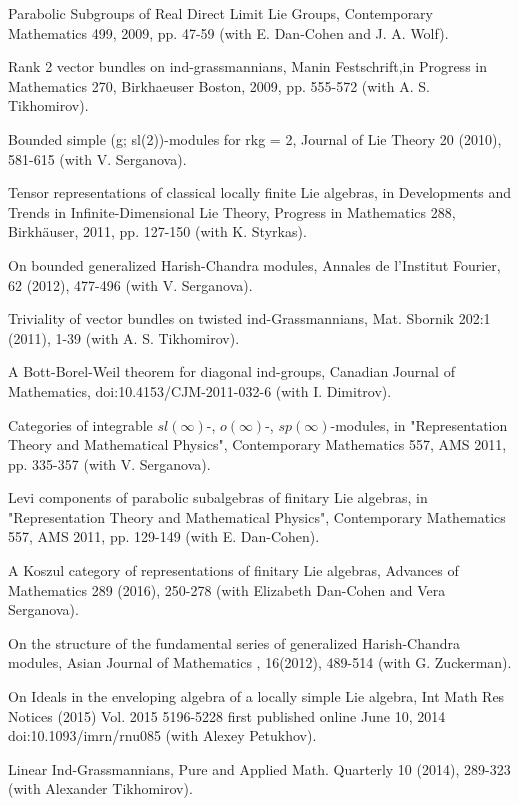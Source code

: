 \documentclass[11pt]{amsart}
\begin{document}
\myss \label{47.} Parabolic Subgroups of Real Direct Limit Lie Groups, Contemporary Mathematics 499, 2009, pp. 47-59 (with E. Dan-Cohen and J. A. Wolf).

\myss \label{48.} Rank 2 vector bundles on ind-grassmannians, Manin Festschrift,in Progress in Mathematics 270, Birkhaeuser Boston, 2009, pp. 555-572 (with A. S. Tikhomirov).

\myss \label{49.} Bounded simple (g; sl(2))-modules for rkg = 2, Journal of Lie Theory 20 (2010), 581-615 (with V. Serganova).

\myss \label{50.} Tensor representations of classical locally finite Lie algebras, in Developments and Trends in Infinite-Dimensional Lie Theory, Progress in Mathematics 288, Birkh\"auser, 2011, pp. 127-150 (with K. Styrkas).

\myss \label{51.} On bounded generalized Harish-Chandra modules, Annales de l'Institut Fourier, 62 (2012), 477-496 (with V. Serganova).

\myss \label{52.} Triviality of vector bundles on twisted ind-Grassmannians, Mat. Sbornik 202:1 (2011), 1-39 (with A. S. Tikhomirov).

\myss \label{53.} A Bott-Borel-Weil theorem for diagonal ind-groups, Canadian Journal of Mathematics, doi:10.4153/CJM-2011-032-6 (with I. Dimitrov).

\myss \label{54.} Categories of integrable $sl(\infty)$-, $o(\infty)$-, $sp(\infty)$-modules, in "Representation Theory and Mathematical Physics", Contemporary Mathematics 557, AMS 2011, pp. 335-357 (with V. Serganova).

\myss \label{55.} Levi components of parabolic subalgebras of finitary Lie algebras, in "Representation Theory and Mathematical Physics", Contemporary Mathematics 557, AMS 2011, pp. 129-149 (with E. Dan-Cohen).

\myss \label{56.} A Koszul category of representations of finitary Lie algebras, Advances of Mathematics 289 (2016), 250-278 (with Elizabeth Dan-Cohen and Vera Serganova).

\myss \label{57.} On the structure of the fundamental series of generalized Harish-Chandra modules, Asian Journal of Mathematics , 16(2012), 489-514 (with G. Zuckerman).

\myss \label{58.} On Ideals in the enveloping algebra of a locally simple Lie algebra, Int Math Res Notices (2015) Vol. 2015 5196-5228 first published online June 10, 2014 doi:10.1093/imrn/rnu085 (with Alexey Petukhov).

\myss \label{59.} Linear Ind-Grassmannians, Pure and Applied Math. Quarterly 10 (2014), 289-323 (with Alexander Tikhomirov).
\end{document}

